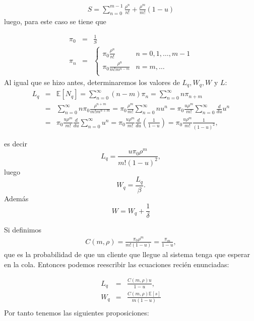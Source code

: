 \documentclass{article}
\newcommand{\esp}{\mathbb{E}}
\begin{document}
\begin{eqnarray}
S=\sum_{n=0}^{m-1}\frac{\rho^{n}}{n!}+\frac{\rho^{m}}{m!}\left(1-u\right)
\end{eqnarray}
luego, para este caso se tiene que

\begin{eqnarray}
\pi_{0}&=&\frac{1}{S}\\
\pi_{n}&=&\left\{\begin{array}{cc}
\pi_{0}\frac{\rho^{n}}{n!} & n=0,1,\ldots,m-1\\
\pi_{0}\frac{\rho^{n}}{m!m^{n-m}}& n=m,\ldots\\
\end{array}\right.
\end{eqnarray}
Al igual que se hizo antes, determinaremos los valores de
$L_{q},W_{q},W$ y $L$:
\begin{eqnarray*}
L_{q}&=&\esp\left[N_{q}\right]=\sum_{n=0}^{\infty}\left(n-m\right)\pi_{n}=\sum_{n=0}^{\infty}n\pi_{n+m}\\
&=&\sum_{n=0}^{\infty}n\pi_{0}\frac{\rho^{n+m}}{m!m^{n+m}}=\pi_{0}\frac{\rho^{m}}{m!}\sum_{n=0}^{\infty}nu^{n}=\pi_{0}\frac{u\rho^{m}}{m!}\sum_{n=0}^{\infty}\frac{d}{du}u^{n}\\
&=&\pi_{0}\frac{u\rho^{m}}{m!}\frac{d}{du}\sum_{n=0}^{\infty}u^{n}=\pi_{0}\frac{u\rho^{m}}{m!}\frac{d}{du}\left(\frac{1}{1-u}\right)=\pi_{0}\frac{u\rho^{m}}{m!}\frac{1}{\left(1-u\right)^{2}},
\end{eqnarray*}

es decir
\begin{equation}
L_{q}=\frac{u\pi_{0}\rho^{m}}{m!\left(1-u\right)^{2}},
\end{equation}
luego
\begin{equation}
W_{q}=\frac{L_{q}}{\beta}.
\end{equation}
Adem\'as
\begin{equation}
W=W_{q}+\frac{1}{\delta}
\end{equation}

Si definimos
\begin{eqnarray}
C\left(m,\rho\right)=\frac{\pi_{0}\rho^{m}}{m!\left(1-u\right)}=\frac{\pi_{m}}{1-u},
\end{eqnarray}
que es la probabilidad de que un cliente que llegue al sistema
tenga que esperar en la cola. Entonces podemos reescribir las
ecuaciones reci\'en enunciadas:

\begin{eqnarray}
L_{q}&=&\frac{C\left(m,\rho\right)u}{1-u},\\
W_{q}&=&\frac{C\left(m,\rho\right)\esp\left[s\right]}{m\left(1-u\right)}\\
\end{eqnarray}
Por tanto tenemos las siguientes proposiciones:
\end{document}
